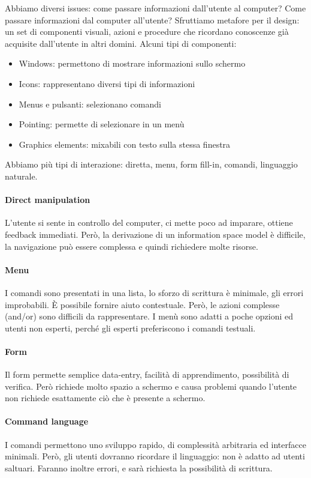 \documentclass[11pt]{article}
\begin{document}
Abbiamo diversi issues: come passare informazioni dall'utente al computer? Come passare informazioni dal computer all'utente? Sfruttiamo metafore per il design: un set di componenti visuali, azioni e procedure che ricordano conoscenze già acquisite dall'utente in altri domini. Alcuni tipi di componenti:
\begin{itemize}
    \item Windows: permettono di mostrare informazioni sullo schermo
    \item Icons: rappresentano diversi tipi di informazioni 
    \item Menus e pulsanti: selezionano comandi 
    \item Pointing: permette di selezionare in un menù 
    \item Graphics elements: mixabili con testo sulla stessa finestra 
\end{itemize}
Abbiamo più tipi di interazione: diretta, menu, form fill-in, comandi, linguaggio naturale. 
\paragraph{Direct manipulation} L'utente si sente in controllo del computer, ci mette poco ad imparare, ottiene feedback immediati. Però, la derivazione di un information space model è difficile, la navigazione può essere complessa e quindi richiedere molte risorse. 
\paragraph{Menu} I comandi sono presentati in una lista, lo sforzo di scrittura è minimale, gli errori improbabili. È possibile fornire aiuto contestuale. Però, le azioni complesse (and/or) sono difficili da rappresentare. I menù sono adatti a poche opzioni ed utenti non esperti, perché gli esperti preferiscono i comandi testuali. 
\paragraph{Form} Il form permette semplice data-entry, facilità di apprendimento, possibilità di verifica. Però richiede molto spazio a schermo e causa problemi quando l'utente non richiede esattamente ciò che è presente a schermo.
\paragraph{Command language} I comandi permettono uno sviluppo rapido, di complessità arbitraria ed interfacce minimali. Però, gli utenti dovranno ricordare il linguaggio: non è adatto ad utenti saltuari. Faranno inoltre errori, e sarà richiesta la possibilità di scrittura.
\end{document}
